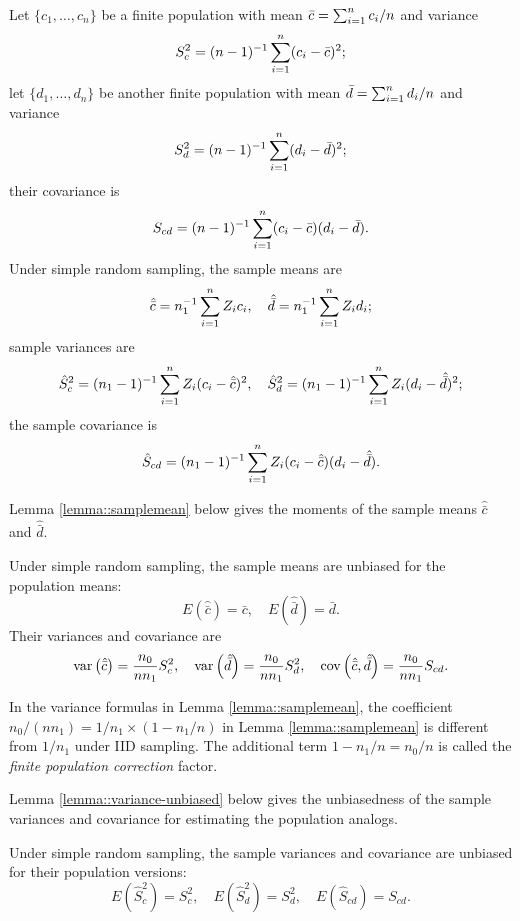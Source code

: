 Let $\{ c_1, \ldots, c_n\} $ be a finite population with mean $ \bar{c}  = \sum_{i=1}^n c_i/n$ and variance
$$
S_c^2 = (n-1)^{-1} \sum_{i=1}^n (c_i -  \bar{c} )^2;
$$
let $\{  d_1, \ldots, d_n \} $ be another finite population with mean $ \bar{d}   = \sum_{i=1}^n d_i/n$ and variance
$$
S_d^2 =  (n-1)^{-1}   \sum_{i=1}^n (d_i -  \bar{d}  )^2;
$$
their covariance is
$$
S_{cd} =  (n-1)^{-1}   \sum_{i=1}^n (c_i -  \bar{c} ) (d_i -  \bar{d}  ).
$$
Under simple random sampling, the sample means are
$$
 \hat{\bar{c}}  =  n_1^{-1} \sum_{i=1}^n Z_i c_i,\quad 
 \hat{\bar{d}}   = n_1^{-1} \sum_{i=1}^n Z_i d_i;
$$
sample variances are
$$
 \hat{S}_c^2   = (n_1 - 1)^{-1} \sum_{i=1}^n Z_i (c_i -  \hat{\bar{c}} )^2,\quad 
 \hat{S}_d^2   = (n_1 - 1)^{-1}   \sum_{i=1}^n Z_i (d_i -  \hat{\bar{d}}  )^2;
$$
the sample covariance is
$$
 \hat{S}_{cd}   = (n_1 - 1)^{-1}  \sum_{i=1}^n Z_i (c_i -  \hat{\bar{c}} ) (d_i -  \hat{\bar{d}}  ). 
$$

Lemma \ref{lemma::samplemean} below gives the moments of the sample means $ \hat{\bar{c}} $ and $ \hat{\bar{d}}  $. 

\begin{lemma}
\label{lemma::samplemean}
Under simple random sampling, the sample means are unbiased for the population means:
$$
E( \hat{\bar{c}} ) =  \bar{c} ,\quad
E( \hat{\bar{d}}  ) =  \bar{d}  .
$$
Their variances and covariance are
\begin{eqnarray*}
\textup{var}\left(   \hat{\bar{c}} \right) = \frac{ n_0}{n n_1  }  S_c^2 ,\quad 
\textup{var}\left(   \hat{\bar{d}}  \right) = \frac{ n_0}{n n_1  }  S_d^2, \quad 
\textup{cov}\left(  \hat{\bar{c}}  ,   \hat{\bar{d}}  \right) = \frac{ n_0}{n n_1 } S_{cd}. 
\end{eqnarray*}
\end{lemma}

In the variance formulas in Lemma \ref{lemma::samplemean},  the coefficient $  n_0 / (n n_1 )  = 1/n_1 \times (1-n_1/n)$ in Lemma \ref{lemma::samplemean} is different from $1/n_1$ under IID sampling. The additional term $1-n_1/n = n_0/n$ is called the {\it finite population correction} factor. 


Lemma \ref{lemma::variance-unbiased} below gives the unbiasedness of the sample variances and covariance for estimating the population analogs. 
 
\begin{lemma}\label{lemma::variance-unbiased}
Under simple random sampling, the sample variances and covariance are unbiased for their population versions:
$$
E( \hat{S}_c^2  ) = S_c^2,\quad 
E( \hat{S}_d^2  ) = S_d^2,\quad
E( \hat{S}_{cd} ) = S_{cd}  .
$$
\end{lemma}


